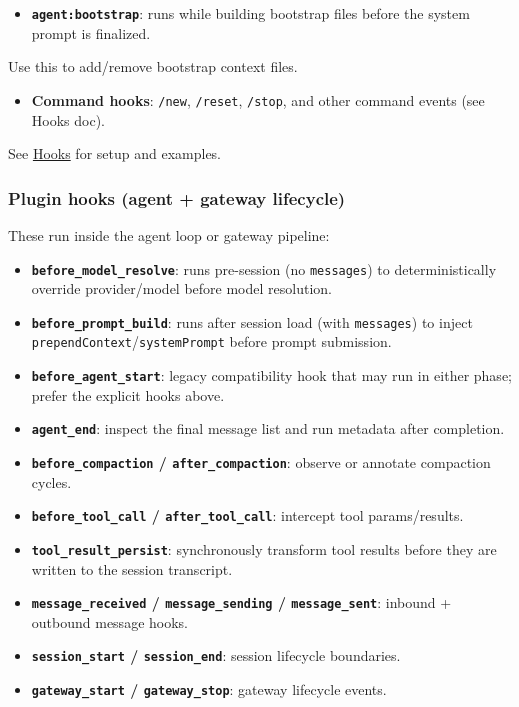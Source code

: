 \begin{itemize}
  \item \textbf{\texttt{agent:bootstrap}}: runs while building bootstrap files before the system prompt is finalized.
\end{itemize}

Use this to add/remove bootstrap context files.
\begin{itemize}
  \item \textbf{Command hooks}: \texttt{/new}, \texttt{/reset}, \texttt{/stop}, and other command events (see Hooks doc).
\end{itemize}


See \href{/automation/hooks}{Hooks} for setup and examples.

\subsubsection{Plugin hooks (agent + gateway lifecycle)}


These run inside the agent loop or gateway pipeline:

\begin{itemize}
  \item \textbf{\texttt{before\_model\_resolve}}: runs pre-session (no \texttt{messages}) to deterministically override provider/model before model resolution.
  \item \textbf{\texttt{before\_prompt\_build}}: runs after session load (with \texttt{messages}) to inject \texttt{prependContext}/\texttt{systemPrompt} before prompt submission.
  \item \textbf{\texttt{before\_agent\_start}}: legacy compatibility hook that may run in either phase; prefer the explicit hooks above.
  \item \textbf{\texttt{agent\_end}}: inspect the final message list and run metadata after completion.
  \item \textbf{\texttt{before\_compaction} / \texttt{after\_compaction}}: observe or annotate compaction cycles.
  \item \textbf{\texttt{before\_tool\_call} / \texttt{after\_tool\_call}}: intercept tool params/results.
  \item \textbf{\texttt{tool\_result\_persist}}: synchronously transform tool results before they are written to the session transcript.
  \item \textbf{\texttt{message\_received} / \texttt{message\_sending} / \texttt{message\_sent}}: inbound + outbound message hooks.
  \item \textbf{\texttt{session\_start} / \texttt{session\_end}}: session lifecycle boundaries.
  \item \textbf{\texttt{gateway\_start} / \texttt{gateway\_stop}}: gateway lifecycle events.
\end{itemize}


